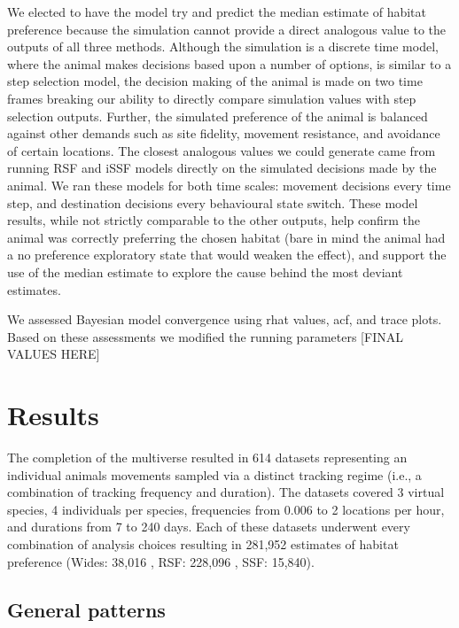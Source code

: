 \documentclass[10pt,a4paper]{article}
\begin{document}
We elected to have the model try and predict the median estimate of habitat preference because the simulation cannot provide a direct analogous value to the outputs of all three methods.
Although the simulation is a discrete time model, where the animal makes decisions based upon a number of options, is similar to a step selection model, the decision making of the animal is made on two time frames breaking our ability to directly compare simulation values with step selection outputs.
Further, the simulated preference of the animal is balanced against other demands such as site fidelity, movement resistance, and avoidance of certain locations.
The closest analogous values we could generate came from running RSF and iSSF models directly on the simulated decisions made by the animal.
We ran these models for both time scales: movement decisions every time step, and destination decisions every behavioural state switch.
These model results, while not strictly comparable to the other outputs, help confirm the animal was correctly preferring the chosen habitat (bare in mind the animal had a no preference exploratory state that would weaken the effect), and support the use of the median estimate to explore the cause behind the most deviant estimates.

We assessed Bayesian model convergence using rhat values, acf, and trace plots.
Based on these assessments we modified the running parameters {[}FINAL VALUES HERE{]}

\hypertarget{results}{%
\section{Results}\label{results}}

The completion of the multiverse resulted in 614 datasets representing an individual animals movements sampled via a distinct tracking regime (i.e., a combination of tracking frequency and duration).
The datasets covered 3 virtual species, 4 individuals per species, frequencies from 0.006 to 2 locations per hour, and durations from 7 to 240 days.
Each of these datasets underwent every combination of analysis choices resulting in
281,952 estimates of habitat preference (Wides: 38,016 , RSF: 228,096 , SSF: 15,840).

\hypertarget{general-patterns}{%
\subsection{General patterns}\label{general-patterns}}
\end{document}
